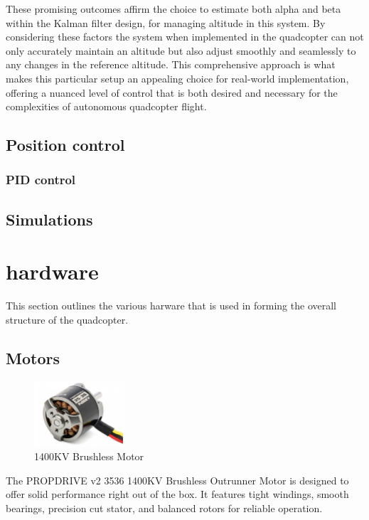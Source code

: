 \documentclass{article}
\begin{document}
These promising outcomes affirm the choice to estimate both alpha and beta within the Kalman filter design, for managing altitude in this system. By considering these factors the system when implemented in the quadcopter can not only accurately maintain an altitude but also adjust smoothly and seamlessly to any changes in the reference altitude. 
This comprehensive approach is what makes this particular setup an appealing choice for real-world implementation, offering a nuanced level of control that is both desired and necessary for the complexities of autonomous quadcopter flight.

\subsection{Position control}
\subsubsection{PID control}

\subsection{Simulations}

\section{hardware}\label{hardware}
This section outlines the various harware that is used in forming the overall structure of the quadcopter.

\subsection{Motors}\label{motors}
\begin{figure}[H]
  \centering
  \includegraphics[width=0.3\textwidth]{Pictures/motors.png} 
  \caption{1400KV Brushless Motor}
  \label{fig:motor}
\end{figure}
The PROPDRIVE v2 3536 1400KV Brushless Outrunner Motor is designed to offer solid performance right out of the box. It features tight windings, smooth bearings, precision cut stator, and balanced rotors for reliable operation.
\end{document}
